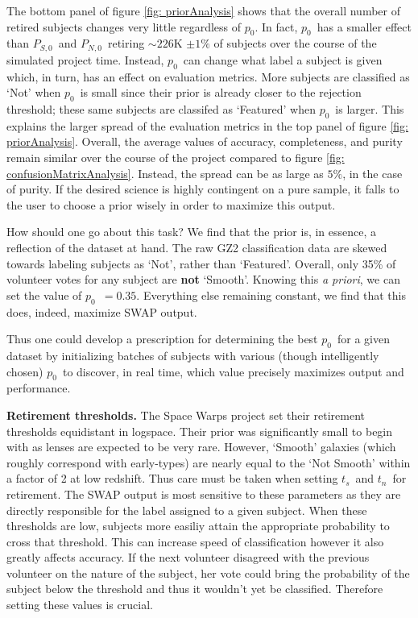 \documentclass[twocolumn]{aastex6}
\newcommand{\Ps}{$P_{S,0}$}
\newcommand{\Pn}{$P_{N,0}$}
\newcommand{\p}{$p_0$}
\newcommand{\ts}{$t_s$}
\newcommand{\tn}{$t_n$}
\begin{document}
The bottom panel of figure \ref{fig: priorAnalysis} shows that the overall number
of retired subjects changes very little regardless of \p. In fact, \p~has a smaller effect 
than \Ps~and \Pn~retiring $\sim226$K $\pm1\%$ of subjects over the course of the 
simulated project time. Instead, \p~can change what label a subject is given which, 
in turn, has an effect on evaluation metrics. More subjects are classified as `Not' 
when \p~is small since their prior is already closer to the rejection threshold; 
these same subjects are classifed as `Featured' when \p~is larger.
This explains the larger spread of the evaluation metrics in the top panel of figure 
\ref{fig: priorAnalysis}.  Overall, the average values of accuracy, completeness, 
and purity remain similar over the course of the project compared to figure 
\ref{fig: confusionMatrixAnalysis}. Instead, the spread can 
be as large as $5\%$, in the case of purity. If the desired science is highly contingent
on a pure sample, it falls to the user to choose a prior wisely in order to maximize 
this output. 

How should one go about this task? We find that the prior is, in essence, a reflection
of the dataset at hand. The raw GZ2 classification data are skewed towards labeling 
subjects as `Not', rather than `Featured'. Overall, only 35\% of volunteer votes for 
any subject are \textbf{not} `Smooth'. Knowing this \textit{a priori}, we can set the 
value of \p~$= 0.35$. Everything else remaining constant, we find that this does, 
indeed, maximize SWAP output. 

Thus one could develop a prescription for determining the best \p~for a given dataset
by initializing batches of subjects with various (though intelligently chosen) \p~to 
discover, in real time, which value precisely maximizes output and performance. 


\textbf{Retirement thresholds.}
The Space Warps project set their retirement thresholds equidistant in logspace. 
Their prior was significantly small to begin with as lenses are expected to be very rare.
However, `Smooth' galaxies (which roughly correspond with early-types) are nearly 
equal to the `Not Smooth' within a factor of 2 at low redshift. Thus care must be taken when 
setting \ts~and \tn~for retirement. The SWAP output is most sensitive to these
parameters as they are directly responsible for the label assigned to a given subject. 
When these thresholds are low, subjects more easiliy attain the appropriate 
probability to cross that threshold. This can increase speed of classification however
it also greatly affects accuracy. If the next volunteer disagreed with the previous 
volunteer on the nature of the subject, her vote could bring the probability of
the subject below the threshold and thus it wouldn't yet be classified. 
Therefore setting these values is crucial. 
\end{document}
